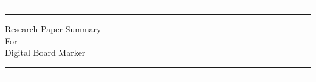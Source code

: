 \documentclass[12pt]{article}
\begin{document}

\begin{titlepage} %

	\centering %
	
	\scshape %
	
	\vspace*{\baselineskip} %
	
	
	\rule{\textwidth}{1.6pt}\vspace*{-\baselineskip}\vspace*{2pt} %
	\rule{\textwidth}{0.4pt} %
	
	\vspace{0.75\baselineskip} %
	
	{\LARGE Research Paper Summary\\ For\\ Digital Board Marker\\} %
	
	\vspace{0.75\baselineskip} %
	
	\rule{\textwidth}{0.4pt}\vspace*{-\baselineskip}\vspace{3.2pt} %
	\rule{\textwidth}{1.6pt} %
	
	\vspace{2\baselineskip} %
	
	


\end{titlepage}
\end{document}
